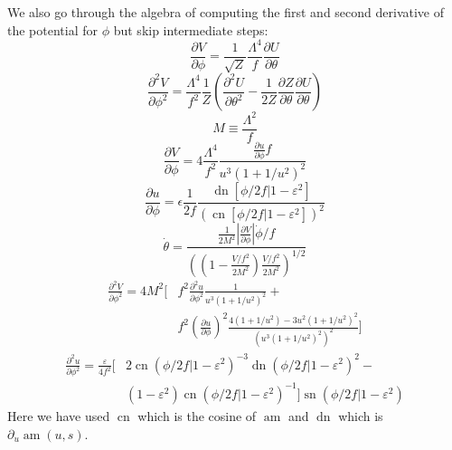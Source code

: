 \documentclass[master,       %
               twoside,        %
               BCOR10mm,       %
               english,ngerman, %
               ]{GAUBM}
\begin{document}
\begin{otherlanguage}{english}
We also go through the algebra of computing the first and second derivative of the potential for $\phi$ but skip intermediate steps:
\begin{equation}
	\frac{\partial V}{\partial \phi} = \frac{1}{\sqrt{Z}} \frac{\Lambda^4}{f} \frac{\partial U}{\partial \theta}
\end{equation}
\begin{equation}
	\frac{\partial^2 V}{\partial \phi^2} = \frac{\Lambda^4}{f^2} \frac{1}{Z} \left( \frac{\partial^2 U}{\partial \theta^2} - \frac{1}{2 Z} \frac{\partial Z}{\partial \theta} \frac{\partial U}{\partial \theta} \right)
\end{equation}
\begin{equation}
	M \equiv \frac{\Lambda^2}{f}
\end{equation}
\begin{equation}
	\frac{\partial V}{\partial \phi} = 4 \frac{\Lambda^4}{f^2} \frac{\frac{\partial u}{\partial \phi} f}{u^3(1 + 1/u^2)^2}
\end{equation}
\begin{equation}
	\frac{\partial u}{\partial \phi} = \epsilon \frac{1}{2 f} \frac{\operatorname{dn}[\phi/2f|1 - \varepsilon^2]}{(\operatorname{cn}[\phi/2f|1 - \varepsilon^2])^2}
\end{equation}
\begin{equation}
	\dot{\theta} = \frac{\frac{1}{2M^2} \left| \frac{\partial V}{\partial \phi} \right| \dot{\phi} / f}{\left(\left(1 - \frac{V/f^2}{2M^2}\right) \frac{V / f^2}{2 M^2} \right)^{1/2}}
\end{equation}
\begin{align}
	\frac{\partial^2 V}{\partial \phi^2} = 4 M^2 \Big[& f^2 \frac{\partial^2 u}{\partial \phi^2} \frac{1}{u^3(1 + 1/u^2)^2} + \nonumber \\ &f^2 \left( \frac{\partial u}{\partial \phi} \right)^2 \frac{4(1 + 1/u^2) - 3u^2(1 + 1/u^2)^2}{\left( u^3(1 + 1/u^2)^2 \right)^2} \Big]
\end{align}
\begin{align}
	\frac{\partial^2 u}{\partial \phi^2} = \frac{\varepsilon}{4 f^2} \big[& 2 \operatorname{cn}(\phi/2f|1 - \varepsilon^2)^{-3} \operatorname{dn}(\phi/2f|1 - \varepsilon^2)^2 -
	\nonumber \\ & 
	(1 - \varepsilon^2) \operatorname{cn}(\phi/2f|1 - \varepsilon^2)^{-1} \big] \operatorname{sn}(\phi/2f|1 - \varepsilon^2)
\end{align}
Here we have used $\operatorname{cn}$ which is the cosine of $\operatorname{am}$ and $\operatorname{dn}$ which is $\partial_u \operatorname{am}(u, s)$.

\end{otherlanguage}
\end{document}
